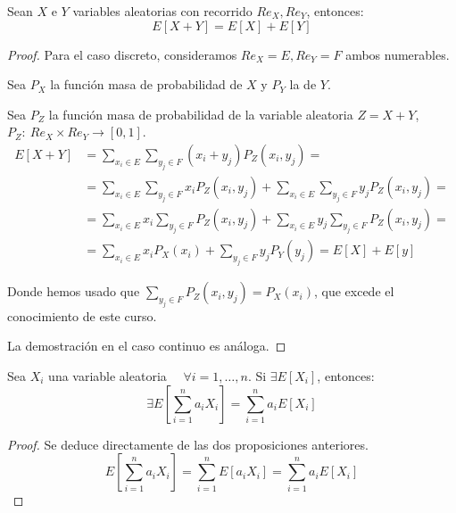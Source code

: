 \begin{prop}
    Sean $X$ e $Y$ variables aleatorias con recorrido $Re_X, Re_Y$, entonces: $$E[X+Y]=E[X]+E[Y]$$
\end{prop}
\begin{proof} 
    Para el caso discreto, consideramos $Re_X = E, Re_Y = F$ ambos numerables.
    
    Sea $P_X$ la función masa de probabilidad de $X$ y $P_Y$ la de $Y$.
    
    Sea $P_Z$ la función masa de probabilidad de la variable aleatoria $Z=X+Y$, $P_Z:~Re_X \times Re_Y
    \rightarrow [0,1]$.
    \begin{equation*}
        \begin{split}
            E[X+Y] &= \sum_{x_i \in E} \sum_{y_j \in F} (x_i+y_j) P_Z(x_i, y_j) =\\
            &=\sum_{x_i \in E} \sum_{y_j \in F} x_i P_Z(x_i, y_j) + \sum_{x_i \in E} \sum_{y_j \in F} y_j P_Z(x_i, y_j) = \\
            &=\sum_{x_i \in E} x_i \sum_{y_j \in F}P_Z(x_i, y_j) + \sum_{x_i \in E} y_j \sum_{y_j \in F} P_Z(x_i, y_j) =\\
            &= \sum_{x_i \in E}x_i P_X(x_i) +\sum_{y_j \in F}y_j P_Y(y_j) = E[X] + E[y]
        \end{split}
    \end{equation*}
    
    Donde hemos usado que $\sum\limits_{y_j \in F}P_Z(x_i, y_j) = P_X(x_i)$, que excede el conocimiento de este curso.

    La demostración en el caso continuo es análoga.
\end{proof}

\begin{coro}[Linealidad]
    Sea $X_i$ una variable aleatoria $\quad \forall i=1,\dots, n$. Si $\exists E[X_i]$, entonces:
    \begin{equation*}
        \exists E\left[\sum_{i=1}^n a_iX_i\right] = \sum_{i=1}^n a_iE[X_i]
    \end{equation*}
\end{coro}
\begin{proof}
    Se deduce directamente de las dos proposiciones anteriores.
    \begin{equation*}
        E\left[\sum_{i=1}^n a_iX_i\right] = \sum_{i=1}^n E[a_iX_i] = \sum_{i=1}^n a_iE[X_i]
    \end{equation*}
\end{proof}

